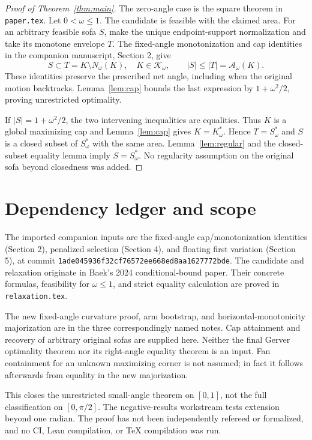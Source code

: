 \documentclass[11pt]{article}
\begin{document}
\begin{proof}[Proof of Theorem~\ref{thm:main}]
The zero-angle case is the square theorem in \texttt{paper.tex}. Let $0<\omega\le1$. The candidate is feasible with the claimed area. For an arbitrary feasible sofa $S$, make the unique endpoint-support normalization and take its monotone envelope $T$. The fixed-angle monotonization and cap identities in the companion manuscript, Section 2, give
\[
 S\subset T=K\setminus N_\omega(K),\quad K\in\mathcal K_\omega,
 \qquad |S|\le|T|=\mathcal A_\omega(K).
\]
These identities preserve the prescribed net angle, including when the original motion backtracks. Lemma~\ref{lem:cap} bounds the last expression by $1+\omega^2/2$, proving unrestricted optimality.

If $|S|=1+\omega^2/2$, the two intervening inequalities are equalities. Thus $K$ is a global maximizing cap and Lemma~\ref{lem:cap} gives $K=K_\omega^*$. Hence $T=S_\omega^*$ and $S$ is a closed subset of $S_\omega^*$ with the same area. Lemma~\ref{lem:regular} and the closed-subset equality lemma imply $S=S_\omega^*$. No regularity assumption on the original sofa beyond closedness was added.
\end{proof}

\section{Dependency ledger and scope}
The imported companion inputs are the fixed-angle cap/monotonization identities (Section 2), penalized selection (Section 4), and floating first variation (Section 5), at commit \texttt{1ade045936f32cf76572ee668ed8aa1627772bde}. The candidate and relaxation originate in Baek's 2024 conditional-bound paper. Their concrete formulas, feasibility for $\omega\le1$, and strict equality calculation are proved in \texttt{relaxation.tex}.

The new fixed-angle curvature proof, arm bootstrap, and horizontal-monotonicity majorization are in the three correspondingly named notes. Cap attainment and recovery of arbitrary original sofas are supplied here. Neither the final Gerver optimality theorem nor its right-angle equality theorem is an input. Fan containment for an unknown maximizing corner is not assumed; in fact it follows afterwards from equality in the new majorization.

This closes the unrestricted small-angle theorem on $[0,1]$, not the full classification on $[0,\pi/2]$. The negative-results workstream tests extension beyond one radian. The proof has not been independently refereed or formalized, and no CI, Lean compilation, or TeX compilation was run.
\end{document}

